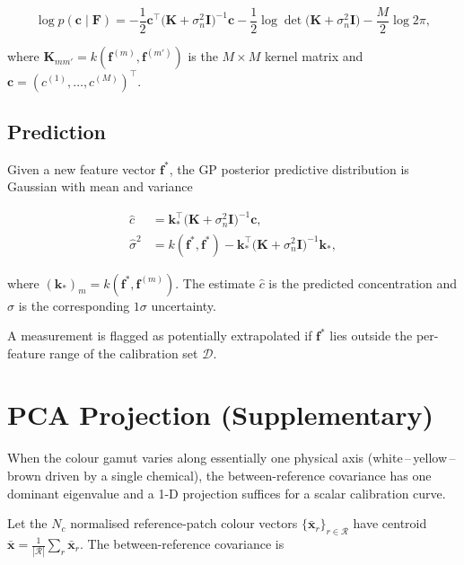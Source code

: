 \documentclass[11pt, a4paper]{article}
\newcommand{\bx}{\mathbf{x}}
\newcommand{\bI}{\mathbf{I}}
\begin{document}
\begin{equation}
  \log p(\mathbf{c} \mid \mathbf{F})
    = -\frac{1}{2}\mathbf{c}^{\top}
        \bigl(\mathbf{K} + \sigma_n^2\bI\bigr)^{-1}\mathbf{c}
      -\frac{1}{2}\log\det\!\bigl(\mathbf{K} + \sigma_n^2\bI\bigr)
      -\frac{M}{2}\log 2\pi,
  \label{eq:log-ml}
\end{equation}

where $\mathbf{K}_{mm'} = k(\mathbf{f}^{(m)}, \mathbf{f}^{(m')})$
is the $M \times M$ kernel matrix and
$\mathbf{c} = (c^{(1)}, \ldots, c^{(M)})^{\top}$.

\subsection{Prediction}

Given a new feature vector $\mathbf{f}^*$, the GP posterior
predictive distribution is Gaussian with mean and variance

\begin{align}
  \hat{c}
    &= \mathbf{k}_*^{\top}
       \bigl(\mathbf{K} + \sigma_n^2\bI\bigr)^{-1}\mathbf{c},
  \label{eq:gp-mean} \\[4pt]
  \hat{\sigma}^2
    &= k(\mathbf{f}^*, \mathbf{f}^*)
       - \mathbf{k}_*^{\top}
         \bigl(\mathbf{K} + \sigma_n^2\bI\bigr)^{-1}
         \mathbf{k}_*,
  \label{eq:gp-var}
\end{align}

where $(\mathbf{k}_*)_m = k(\mathbf{f}^*, \mathbf{f}^{(m)})$.
The estimate $\hat{c}$ is the predicted concentration and
$\hat{\sigma}$ is the corresponding $1\sigma$ uncertainty.

A measurement is flagged as potentially extrapolated if
$\mathbf{f}^*$ lies outside the per-feature range of the calibration
set $\mathcal{D}$.

\section{PCA Projection (Supplementary)}

When the colour gamut varies along essentially one physical axis
(white\,--\,yellow\,--\,brown driven by a single chemical), the
between-reference covariance has one dominant eigenvalue and a 1-D
projection suffices for a scalar calibration curve.

Let the $N_c$ normalised reference-patch colour vectors
$\{\bar{\bx}_r\}_{r \in \mathcal{R}}$ have centroid
$\bar{\bx} = \frac{1}{|\mathcal{R}|}\sum_r \bar{\bx}_r$.
The between-reference covariance is
\end{document}
